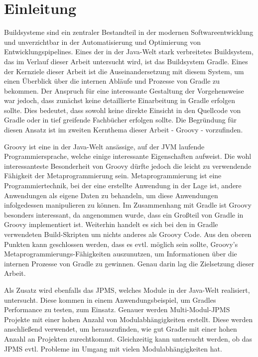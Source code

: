 
\section{Einleitung}

Buildsysteme sind ein zentraler Bestandteil in der modernen Softwareentwicklung und unverzichtbar in der Automatisierung und Optimierung von Entwicklungspipelines.
Eines der in der Java-Welt stark verbreitetes Buildsystem, das im Verlauf dieser Arbeit untersucht wird, ist das Buildsystem Gradle.
Eines der Kernziele dieser Arbeit ist die Auseinandersetzung mit diesem System, um einen Überblick über die internen Abläufe und Prozesse von Gradle zu bekommen.
Der Anspruch für eine interessante Gestaltung der Vorgehensweise war jedoch, dass zunächst keine detaillierte Einarbeitung in Gradle erfolgen sollte.
Dies bedeutet, dass sowohl keine direkte Einsicht in den Quellcode von Gradle oder in tief greifende Fachbücher erfolgen sollte.
Die Begründung für diesen Ansatz ist im zweiten Kernthema dieser Arbeit - Groovy - vorzufinden.

Groovy ist eine in der Java-Welt ansässige, auf der JVM laufende Programmiersprache, welche einige interessante Eigenschaften aufweist.
Die wohl interessanteste Besonderheit von Groovy dürfte jedoch die leicht zu verwendende Fähigkeit der Metaprogrammierung sein.
Metaprogrammierung ist eine Programmiertechnik, bei der eine erstellte Anwendung in der Lage ist, andere Anwendungen als eigene Daten zu behandeln, um diese Anwendungen infolgedessen manipulieren zu können.
Im Zusammenhang mit Gradle ist Groovy besonders interessant, da angenommen wurde, dass ein Großteil von Gradle in Groovy implementiert ist.
Weiterhin handelt es sich bei den in Gradle verwendeten Build-Skripten um nichts anderes als Groovy Code.
Aus den oberen Punkten kann geschlossen werden, dass es evtl. möglich sein sollte, Groovy's Metaprogrammierungs-Fähigkeiten auszunutzen, um Informationen über die internen Prozesse von Gradle zu gewinnen.
Genau darin lag die Zielsetzung dieser Arbeit.

Als Zusatz wird ebenfalls das JPMS, welches Module in der Java-Welt realisiert, untersucht.
Diese kommen in einem Anwendungsbeispiel, um Gradles Performance zu testen, zum Einsatz.
Genauer werden Multi-Modul-JPMS Projekte mit einer hohen Anzahl von Modulabhängigkeiten erstellt.
Diese werden anschließend verwendet, um herauszufinden, wie gut Gradle mit einer hohen Anzahl an Projekten zurechtkommt.
Gleichzeitig kann untersucht werden, ob das JPMS evtl. Probleme im Umgang mit vielen Modulabhängigkeiten hat.

